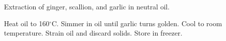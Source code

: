 \documentclass[main]{subfiles}
\begin{document}
Extraction of ginger, scallion, and garlic in neutral oil.

\begin{rec}
Heat oil to 160$^\circ$C.
Simmer in oil until garlic turns golden. Cool to room temperature.
\newstep
Strain oil and discard solids. Store in freezer.
\end{rec}
\end{document}

